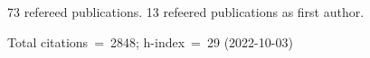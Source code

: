 73 refereed publications. 13 refeered publications as first author.

Total citations~=~2848; h-index~=~29 (2022-10-03)